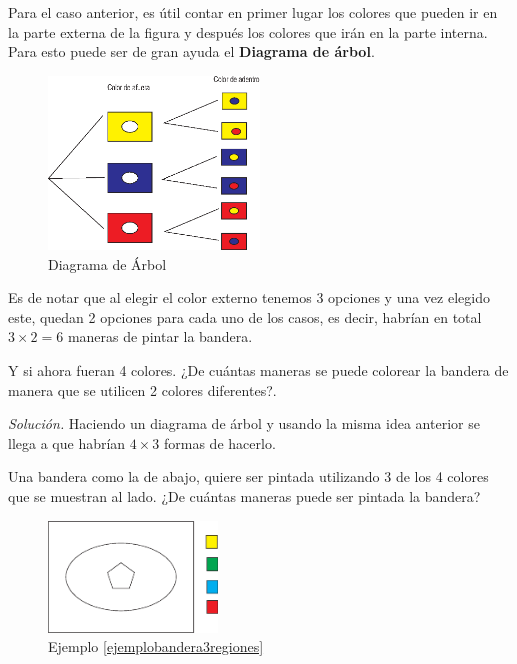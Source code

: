Para el caso anterior, es útil contar en primer lugar los colores que pueden ir en la parte externa de la figura y después los colores que irán en la parte interna. Para esto puede ser de gran ayuda el \textbf{Diagrama de árbol}.

\begin{figure}[H]
	\centering
	\includegraphics[width=0.5\textwidth]{Combinatoria/imgs/diagramadearbolbandera.eps}
	\caption{Diagrama de Árbol}
	\label{Diagramadearbolbandera}
\end{figure}

Es de notar que al elegir el color externo tenemos 3 opciones y una vez elegido este, quedan 2 opciones para cada uno de los casos, es decir, habrían en total $3\times2=6$ maneras de pintar la bandera.

\begin{ejemplo}
	Y si ahora fueran 4 colores. ¿De cuántas maneras se puede colorear la bandera de manera que se utilicen 2 colores diferentes?.
\end{ejemplo}

\textit{Solución.} Haciendo un diagrama de árbol y usando la misma idea anterior se llega a que habrían $4\times 3$ formas de hacerlo. 

\begin{ejemplo}
	Una bandera como la de abajo, quiere ser pintada utilizando 3 de los 4 colores que se muestran al lado. ¿De cuántas maneras puede ser pintada la bandera?
	\label{ejemplobandera3regiones}
\end{ejemplo}

\begin{figure}[H]
	\centering
	\includegraphics[width=0.4\textwidth]{Combinatoria/imgs/bandera3regiones.eps}
	\caption{Ejemplo \ref{ejemplobandera3regiones}}
	\label{bandera3regiones}
\end{figure}

